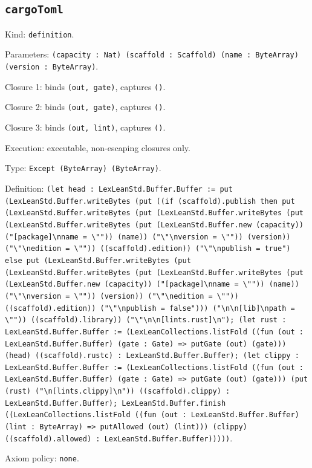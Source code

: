\documentclass[11pt]{article}
\begin{document}
\subsection*{\texttt{cargoToml}}
\noindent Kind: \texttt{definition}.\par
\noindent Parameters: \texttt{(capacity : Nat) (scaffold : Scaffold) (name : ByteArray) (version : ByteArray)}.\par
\noindent Closure 1: binds \texttt{(out, gate)}, captures \texttt{()}.\par
\noindent Closure 2: binds \texttt{(out, gate)}, captures \texttt{()}.\par
\noindent Closure 3: binds \texttt{(out, lint)}, captures \texttt{()}.\par
\noindent Execution: executable, non-escaping closures only.\par
\noindent Type: \texttt{Except (ByteArray) (ByteArray)}.\par
\noindent Definition: \texttt{(let head : LexLeanStd.Buffer.Buffer := put (LexLeanStd.Buffer.writeBytes (put ((if (scaffold).publish then put (LexLeanStd.Buffer.writeBytes (put (LexLeanStd.Buffer.writeBytes (put (LexLeanStd.Buffer.writeBytes (put (LexLeanStd.Buffer.new (capacity)) ("[package]\textbackslash{}nname = \textbackslash{}"")) (name)) ("\textbackslash{}"\textbackslash{}nversion = \textbackslash{}"")) (version)) ("\textbackslash{}"\textbackslash{}nedition = \textbackslash{}"")) ((scaffold).edition)) ("\textbackslash{}"\textbackslash{}npublish = true") else put (LexLeanStd.Buffer.writeBytes (put (LexLeanStd.Buffer.writeBytes (put (LexLeanStd.Buffer.writeBytes (put (LexLeanStd.Buffer.new (capacity)) ("[package]\textbackslash{}nname = \textbackslash{}"")) (name)) ("\textbackslash{}"\textbackslash{}nversion = \textbackslash{}"")) (version)) ("\textbackslash{}"\textbackslash{}nedition = \textbackslash{}"")) ((scaffold).edition)) ("\textbackslash{}"\textbackslash{}npublish = false"))) ("\textbackslash{}n\textbackslash{}n[lib]\textbackslash{}npath = \textbackslash{}"")) ((scaffold).library)) ("\textbackslash{}"\textbackslash{}n\textbackslash{}n[lints.rust]\textbackslash{}n"); (let rust : LexLeanStd.Buffer.Buffer := (LexLeanCollections.listFold ((fun (out : LexLeanStd.Buffer.Buffer) (gate : Gate) => putGate (out) (gate))) (head) ((scaffold).rustc) : LexLeanStd.Buffer.Buffer); (let clippy : LexLeanStd.Buffer.Buffer := (LexLeanCollections.listFold ((fun (out : LexLeanStd.Buffer.Buffer) (gate : Gate) => putGate (out) (gate))) (put (rust) ("\textbackslash{}n[lints.clippy]\textbackslash{}n")) ((scaffold).clippy) : LexLeanStd.Buffer.Buffer); LexLeanStd.Buffer.finish ((LexLeanCollections.listFold ((fun (out : LexLeanStd.Buffer.Buffer) (lint : ByteArray) => putAllowed (out) (lint))) (clippy) ((scaffold).allowed) : LexLeanStd.Buffer.Buffer)))))}.\par
\noindent Axiom policy: \texttt{none}.\par
\end{document}

